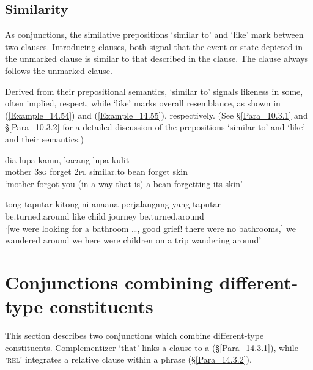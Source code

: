 \subsection{Similarity}
\label{Para_14.2.6}
As conjunctions, the similative prepositions  ‘similar to’ and  ‘like’ mark  between two clauses. Introducing  clauses, both signal that the event or state depicted in the unmarked clause is similar to that described in the  clause. The  clause always follows the unmarked clause.



Derived from their prepositional semantics,  ‘similar to’ signals likeness in some, often implied, respect, while  ‘like’ marks overall resemblance, as shown in (\ref{Example_14.54}) and (\ref{Example_14.55}), respectively. (See §\ref{Para_10.3.1} and §\ref{Para_10.3.2} for a detailed discussion of the prepositions  ‘similar to’ and  ‘like’ and their semantics.)


\ea
\label{Example_14.54}
 {dia} {lupa} {kamu,} {} {kacang} {lupa} {kulit}\\ %
 mother  \textsc{3sg}  forget  \textsc{2pl}  similar.to  bean  forget  skin\\
\glt ‘mother forgot you (in a way that is)  a bean forgetting its skin’ \textstyleExampleSource{[080922-001a-CvPh.0932]}
\z

\ea
\label{Example_14.55}
\gll {\ldots}  tong  taputar    kitong  ni  ana{\Tilde}ana perjalangang  yang  taputar\\  
{}   be.turned.around  like      child journey    be.turned.around\\
\glt ‘[we were looking for a bathroom {\ldots}, good grief! there were no bathrooms,] we wandered around  we here were children on a trip wandering around’ \textstyleExampleSource{[081025-009a-Cv.0059]}
\z

\section{Conjunctions combining different-type constituents}
\label{Para_14.3}
This section describes two conjunctions which combine different-type constit\-uents. Complementizer  ‘that’ links a clause to a   (§\ref{Para_14.3.1}), while   ‘\textsc{rel}’ integrates a relative clause within a  phrase (§\ref{Para_14.3.2}).


